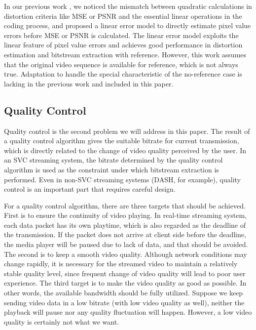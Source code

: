 \documentclass[journal]{IEEEtran}
\begin{document}
In our previous work \cite{Zhang12}, we noticed the mismatch between quadratic calculations in distortion criteria like MSE or PSNR and the essential linear operations in the coding process, and proposed a linear error model to directly estimate pixel value errors before MSE or PSNR is calculated. The linear error model exploits the linear feature of pixel value errors and achieves good performance in distortion estimation and bitstream extraction with reference. However, this work assumes that the original video sequence is available for reference, which is not always true. Adaptation to handle the special characteristic of the no-reference case is lacking in the previous work and included in this paper.

\subsection{Quality Control}

Quality control is the second problem we will address in this paper. The result of a quality control algorithm gives the suitable bitrate for current transmission, which is directly related to the change of video quality perceived by the user. In an SVC streaming system, the bitrate determined by the quality control algorithm is used as the constraint under which bitstream extraction is performed. Even in non-SVC streaming systems (DASH, for example), quality control is an important part that requires careful design.

For a quality control algorithm, there are three targets that should be achieved. First is to ensure the continuity of video playing. In real-time streaming system, each data packet has its own playtime, which is also regarded as the deadline of the transmission. If the packet does not arrive at client side before the deadline, the media player will be paused due to lack of data, and that should be avoided. The second is to keep a smooth video quality. Although network conditions may change rapidly, it is necessary for the streamed video to maintain a relatively stable quality level, since frequent change of video quality will lead to poor user experience. The third target is to make the video quality as good as possible. In other words, the available bandwidth should be fully utilized. Suppose we keep sending video data in a low bitrate (with low video quality as well), neither the playback will pause nor any quality fluctuation will happen. However, a low video quality is certainly not what we want.
\end{document}
